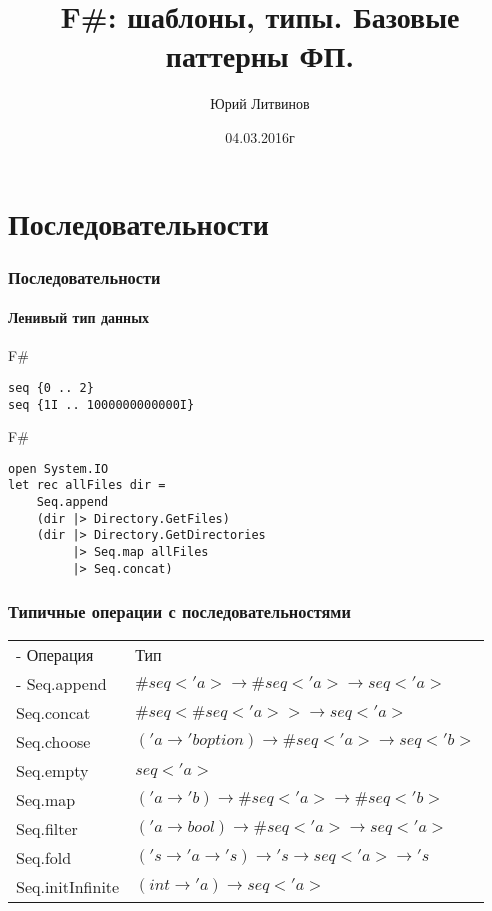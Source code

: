 \documentclass[xetex,mathserif,serif]{beamer}
\title{F\#: шаблоны, типы. Базовые паттерны ФП.}
\author{Юрий Литвинов}
\date{04.03.2016г}
\begin{document}
	
	\frame{\titlepage}

	\section{Последовательности}
	
	\begin{frame}[fragile]
		\frametitle{Последовательности}
		\framesubtitle{Ленивый тип данных}
		\begin{exampleblock}{F\#}
			\begin{lstlisting}
seq {0 .. 2}
seq {1I .. 1000000000000I}
\end{lstlisting}
\end{exampleblock}

		\begin{exampleblock}{F\#}
			\begin{lstlisting}
open System.IO
let rec allFiles dir =
    Seq.append
    (dir |> Directory.GetFiles)
    (dir |> Directory.GetDirectories 
         |> Seq.map allFiles 
         |> Seq.concat)
\end{lstlisting}
\end{exampleblock}
\end{frame}

	\begin{frame}
		\frametitle{Типичные операции с последовательностями}
		\begin{small}
			\begin{tabu} {| X[0.5 l p] | X[1 l p] |}
				\tabucline-
				Операция                               & Тип                    \\
				\tabucline-
				\everyrow{\tabucline-}
				Seq.append                    & $\#seq<'a> \to \#seq<'a> \to seq<'a>$ \\
				Seq.concat                    & $\#seq<\#seq<'a>> \to seq<'a>$ \\
				Seq.choose                    & $('a \to 'b option) \to \#seq<'a> \to seq<'b>$ \\
				Seq.empty                     & $seq<'a>$ \\
				Seq.map                       & $('a \to 'b) \to \#seq<'a> \to \#seq<'b>$ \\
				Seq.filter                    & $('a \to bool) \to \#seq<'a> \to seq<'a>$ \\
				Seq.fold                      & $('s \to 'a \to 's) \to 's \to seq<'a> \to 's$ \\
				Seq.initInfinite          & $(int \to 'a) \to seq<'a>$ \\
\end{tabu}
\end{small}
\end{frame}
\end{document}

